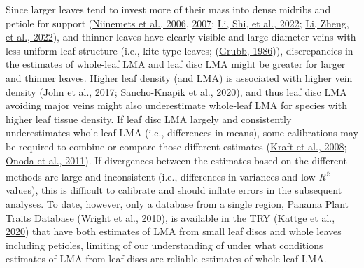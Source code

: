 \documentclass[
  12pt,
  a4paper,
,tablecaptionabove
]{scrartcl}
\begin{document}
Since larger leaves tend to invest more of their mass into dense midribs and petiole for support (\protect\hyperlink{ref-Niinemets2006}{Niinemets et al., 2006}, \protect\hyperlink{ref-Niinemets2007}{2007}; \protect\hyperlink{ref-Li2022}{Li, Shi, et al., 2022}; \protect\hyperlink{ref-Li2022a}{Li, Zheng, et al., 2022}), and thinner leaves have clearly visible and large-diameter veins with less uniform leaf structure (i.e., kite-type leaves; (\protect\hyperlink{ref-Grubb1986}{Grubb, 1986})), discrepancies in the estimates of whole-leaf LMA and leaf disc LMA might be greater for larger and thinner leaves.
Higher leaf density (and LMA) is associated with higher vein density (\protect\hyperlink{ref-John2017}{John et al., 2017}; \protect\hyperlink{ref-Sancho-Knapik2020}{Sancho-Knapik et al., 2020}), and thus leaf disc LMA avoiding major veins might also underestimate whole-leaf LMA for species with higher leaf tissue density.
If leaf disc LMA largely and consistently underestimates whole-leaf LMA (i.e., differences in means), some calibrations may be required to combine or compare those different estimates (\protect\hyperlink{ref-Kraft2008}{Kraft et al., 2008}; \protect\hyperlink{ref-Onoda2011}{Onoda et al., 2011}).
If divergences between the estimates based on the different methods are large and inconsistent (i.e., differences in variances and low \emph{R\textsuperscript{2}} values), this is difficult to calibrate and should inflate errors in the subsequent analyses.
To date, however, only a database from a single region, Panama Plant Traits Database (\protect\hyperlink{ref-Wright2010}{Wright et al., 2010}), is available in the TRY (\protect\hyperlink{ref-Kattge2020}{Kattge et al., 2020}) that have both estimates of LMA from small leaf discs and whole leaves including petioles, limiting of our understanding of under what conditions estimates of LMA from leaf discs are reliable estimates of whole-leaf LMA.
\end{document}
